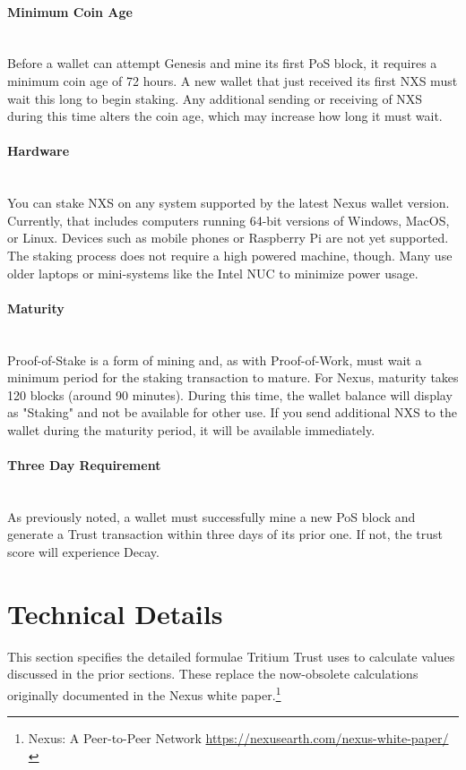 \documentclass[11pt]{article}
\begin{document}
\paragraph{Minimum Coin Age} ~\\
Before a wallet can attempt Genesis and mine its first PoS block, it requires a minimum coin age of 72 hours. A new wallet that just received its first NXS must wait this long to begin staking. Any additional sending or receiving of NXS during this time alters the coin age, which may increase how long it must wait. 

\paragraph{Hardware} ~\\
You can stake NXS on any system supported by the latest Nexus wallet version. Currently, that includes computers running 64-bit versions of Windows, MacOS, or Linux. Devices such as mobile phones or Raspberry Pi are not yet supported. The staking process does not require a high powered machine, though. Many use older laptops or mini-systems like the Intel NUC to minimize power usage. 

\paragraph{Maturity} ~\\
Proof-of-Stake is a form of mining and, as with Proof-of-Work, must wait a minimum period for the staking transaction to mature. For Nexus, maturity takes 120 blocks (around 90 minutes). During this time, the wallet balance will display as "Staking" and not be available for other use. If you send additional NXS to the wallet during the maturity period, it will be available immediately.

\paragraph{Three Day Requirement} ~\\
As previously noted, a wallet must successfully mine a new PoS block and generate a Trust transaction within three days of its prior one. If not, the trust score will experience Decay. \\

\bigskip

\section{Technical Details}
This section specifies the detailed formulae Tritium Trust uses to calculate values discussed in the prior sections. These replace the now-obsolete calculations originally documented in the Nexus white paper.\footnote{Nexus: A Peer-to-Peer Network \url{https://nexusearth.com/nexus-white-paper/}}
\end{document}
